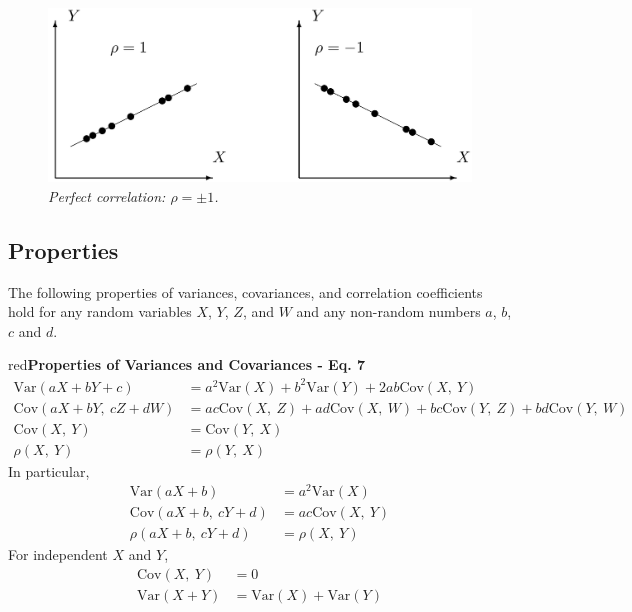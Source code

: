 \documentclass{article}
\newenvironment{formula}[1]{\begin{mybox}{red}{\textbf{#1}}}{\end{mybox}}
\begin{document}
\begin{figure}[h!]
    \centering
    \includegraphics[width=.4\textwidth]{img/fig3.5.png}
    \caption{\textit{Perfect correlation: $\rho = \pm 1$.}}
\end{figure}

\subsection{Properties}

The following properties of variances, covariances, and correlation coefficients hold for any random variables $X$, $Y$, $Z$, and $W$ and any non-random numbers $a$, $b$, $c$ and $d$.
\begin{formula}{Properties of Variances and Covariances - Eq. 7}
\begin{align*}
    \text{Var}(aX + bY + c) &= a^2\text{Var}(X) + b^2\text{Var}(Y) + 2ab\text{Cov}(X,\ Y)\\ \text{Cov}(aX + bY,\ cZ + dW) &= ac\text{Cov}(X,\ Z) + ad\text{Cov}(X,\ W) + bc\text{Cov}(Y,\ Z) + bd\text{Cov}(Y,\ W)\\
    \text{Cov}(X,\ Y) &= \text{Cov}(Y,\ X)\\
    \rho(X,\ Y) &= \rho(Y,\ X)
\end{align*}
In particular,
\begin{align*}
    \text{Var}(aX + b) &= a^2\text{Var}(X)\\
    \text{Cov}(aX + b,\ cY + d) &= ac\text{Cov}(X,\ Y)\\
    \rho(aX + b,\ cY + d) &= \rho(X,\ Y)
\end{align*}
For independent $X$ and $Y$,
\begin{align*}
    \text{Cov}(X,\ Y) &= 0\\
    \text{Var}(X + Y) &= \text{Var}(X) + \text{Var}(Y)
\end{align*}
\end{formula}
\end{document}
